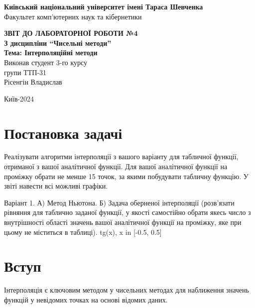 \documentclass[a4paper, 12pt]{article}
\begin{document}
\begin{titlepage}
	\begin{center}
		\Large
		\textbf{Київський національний університет імені Тараса Шевченка} \\
		Факультет комп'ютерних наук та кібернетики \\

		\vspace{6cm}

		\textbf{\LARGE ЗВІТ ДО ЛАБОРАТОРНОЇ РОБОТИ №4} \\[0.5cm]
		\textbf{З дисципліни ``Чисельні методи''} \\[0.5cm]
		\textbf{Тема: Інтерполяційні методи} \\

		\vfill
		\hspace{7cm} Виконав студент 3-го курсу \\
		\hspace{7cm} групи ТТП-31 \\
		\hspace{7cm} Рісенгін Владислав \\
		\vspace{2cm}

		Київ-2024
	\end{center}
\end{titlepage}

\newpage


\section{Постановка задачі}

Реалізувати алгоритми інтерполяції з вашого варіанту для табличної функції, отриманої з вашої аналітичної функції. Для вашої аналітичної функції на проміжку обрати не менше 15 точок, за якими побудувати табличну функцію. У звіті навести всі можливі графіки. 

Варіант 1. 
А) Метод Ньютона.
Б) Задача оберненої інтерполяції (розв’язати рівняння  для таблично заданої функції, у якості  самостійно обрати якесь число з внутрішності області значень вашої аналітичної функції на проміжку, яке при цьому не міститься в таблиці).
tg(x), x in [-0.5, 0.5]

\section{Вступ}
Інтерполяція є ключовим методом у чисельних методах для наближення значень функцій у невідомих точках на основі відомих даних.
\end{document}
